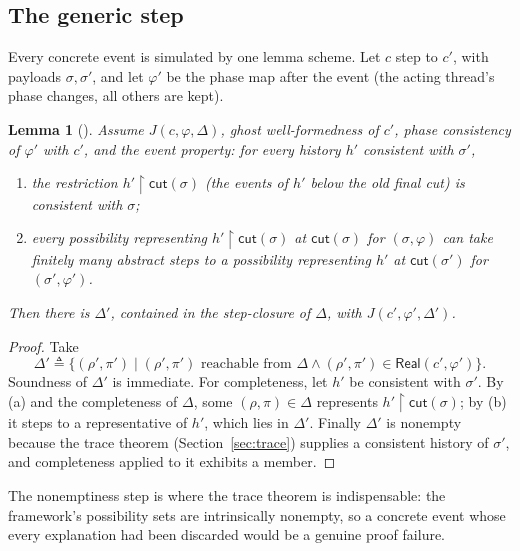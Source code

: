 \documentclass[11pt]{article}
\newtheorem{lemma}{Lemma}[section]
\theoremstyle{definition}
\theoremstyle{remark}
\newcommand{\poss}{\Delta}
\newcommand{\conc}{\sigma}
\newcommand{\abst}{\rho}
\newcommand{\tokens}{\pi}
\newcommand{\code}[1]{\texttt{\detokenize{#1}}}
\newcommand{\Real}{\mathsf{Real}}
\newcommand{\cut}{\mathsf{cut}}
\begin{document}
\subsection{The generic step}

Every concrete event is simulated by one lemma scheme.  Let \(c\) step to
\(c'\), with payloads \(\conc,\conc'\), and let \(\varphi'\) be the phase map
after the event (the acting thread's phase changes, all others are kept).

\begin{lemma}[\code{real_step_generic}]\label{lem:generic}
Assume \(J(c,\varphi,\poss)\), ghost well-formedness of \(c'\), phase
consistency of \(\varphi'\) with \(c'\), and the \emph{event property}:
for every history \(h'\) consistent with \(\conc'\),
\begin{enumerate}[nosep]
\item[(a)] the restriction \(h'{\restriction}\cut(\conc)\) (the events of
  \(h'\) below the old final cut) is consistent with \(\conc\);
\item[(b)] every possibility representing
  \(h'{\restriction}\cut(\conc)\) at \(\cut(\conc)\) for \((\conc,\varphi)\)
  can take finitely many abstract steps to a possibility representing
  \(h'\) at \(\cut(\conc')\) for \((\conc',\varphi')\).
\end{enumerate}
Then there is \(\poss'\), contained in the step-closure of \(\poss\), with
\(J(c',\varphi',\poss')\).
\end{lemma}

\begin{proof}
Take
\[
  \poss'\triangleq\{(\abst',\tokens')\mid
    (\abst',\tokens')\text{ reachable from }\poss\land
    (\abst',\tokens')\in\Real(c',\varphi')\}.
\]
Soundness of \(\poss'\) is immediate.  For completeness, let \(h'\) be
consistent with \(\conc'\).  By (a) and the completeness of \(\poss\), some
\((\abst,\tokens)\in\poss\) represents \(h'{\restriction}\cut(\conc)\); by
(b) it steps to a representative of \(h'\), which lies in \(\poss'\).
Finally \(\poss'\) is nonempty because the trace theorem
(Section~\ref{sec:trace}) supplies a consistent history of \(\conc'\), and
completeness applied to it exhibits a member.
\end{proof}

The nonemptiness step is where the trace theorem is indispensable: the
framework's possibility sets are intrinsically nonempty, so a concrete
event whose every explanation had been discarded would be a genuine proof
failure.
\end{document}
